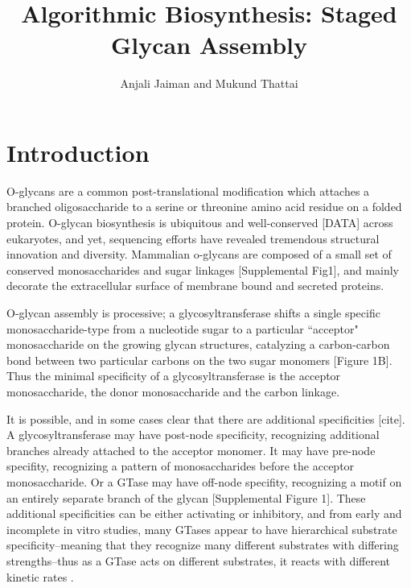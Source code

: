 \documentclass[twocolumn]{article}
\begin{document}
\graphicspath{ {Images/} }
\sectionfont{\fontsize{11}{0}\selectfont}
\setlength{\headsep}{0pt}


\setlength{\parindent}{0pt}

\title{Algorithmic Biosynthesis: Staged Glycan Assembly}
\author{Anjali Jaiman and Mukund Thattai}
\maketitle

\section*{Introduction}
O-glycans are a common post-translational modification which attaches a branched oligosaccharide to a serine or threonine amino acid residue on a folded protein. O-glycan biosynthesis is ubiquitous \cite{Apweiler1999} and well-conserved [DATA] across eukaryotes, and yet, sequencing efforts have revealed tremendous structural innovation and diversity. Mammalian o-glycans are composed of a small set of conserved monosaccharides and sugar linkages \cite{Adibekian2010, Herget2008} [Supplemental Fig1], and mainly decorate the extracellular surface of membrane bound and secreted proteins.

O-glycan assembly is processive; a glycosyltransferase shifts a single specific monosaccharide-type from a nucleotide sugar to a particular ``acceptor" monosaccharide on the growing glycan structures, catalyzing a carbon-carbon bond between two particular carbons on the two sugar monomers [Figure 1B]. Thus the minimal specificity of a glycosyltransferase is the acceptor monosaccharide, the donor monosaccharide and the carbon linkage. 

It is possible, and in some cases clear that there are additional specificities [cite]. A glycosyltransferase may have post-node specificity, recognizing additional branches already attached to the acceptor monomer. It may have pre-node specifity, recognizing a pattern of monosaccharides before the acceptor monosaccharide. Or a GTase may have off-node specifity, recognizing a motif on an entirely separate branch of the glycan [Supplemental Figure 1]. These additional specificities can be either activating or inhibitory, and from early and incomplete in vitro studies, many GTases appear to have hierarchical substrate specificity--meaning that they recognize many different substrates with differing strengths--thus as a GTase acts on different substrates, it reacts with different kinetic rates \cite{Blixt2008}. 
\end{document}
